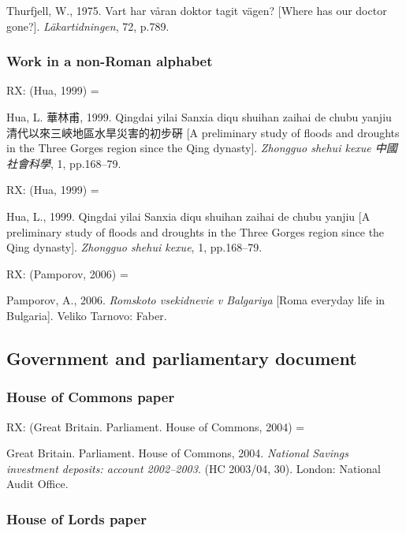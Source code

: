 Thurfjell, W., 1975. Vart har våran doktor tagit vägen? [Where has our doctor gone?]. \emph{Läkartidningen}, 72, p.789.



\subsubsection*{Work in a non-Roman alphabet}

RX: (Hua, 1999) = \cite{hua1999qys1}

Hua, L. 華林甫, 1999. Qingdai yilai Sanxia diqu shuihan zaihai de chubu yanjiu 清代以來三峽地區水旱災害的初步硏 [A preliminary study of floods and droughts in the Three Gorges region since the Qing dynasty]. \emph{Zhongguo shehui kexue \emph{中國社會科學}}, 1, pp.168--79.


RX: (Hua, 1999) = \cite{hua1999qys2}

Hua, L., 1999. Qingdai yilai Sanxia diqu shuihan zaihai de chubu yanjiu [A preliminary study of floods and droughts in the Three Gorges region since the Qing dynasty]. \emph{Zhongguo shehui kexue}, 1, pp.168--79.


RX: (Pamporov, 2006) = \cite{pamporov2006rvb}

Pamporov, A., 2006. \emph{Romskoto vsekidnevie v Balgariya} [Roma everyday life in Bulgaria]. Veliko Tarnovo: Faber.



\subsection{Government and parliamentary document}


\subsubsection*{House of Commons paper}

RX: (Great Britain. Parliament. House of Commons, 2004) = \cite{gb.hc2003/04-30}

Great Britain. Parliament. House of Commons, 2004. \emph{National Savings investment deposits: account 2002--2003}. (HC 2003/04, 30). London: National Audit Office.



\subsubsection*{House of Lords paper}

